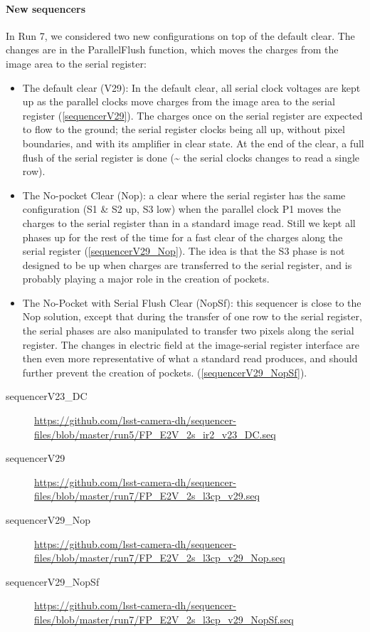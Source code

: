 \paragraph{New sequencers}\label{new-sequencers}
In Run 7, we considered two new configurations on top of the default clear. The changes are in the ParallelFlush function, which
moves the charges from the image area to the serial register:

\begin{itemize}
\tightlist
\item
  The default clear (V29): In the default clear, all serial clock voltages are
  kept up as the parallel clocks move charges from the image area to the
  serial register (\hyperref[sequencerV29]{{[}sequencerV29{]}}). The
  charges once on the serial register are expected to flow to the ground;
  the serial register clocks being all up, without pixel boundaries, and
  with its amplifier in clear state. At the end of the clear, a full
  flush of the serial register is done (\textasciitilde{} the serial
  clocks changes to read a single row).
\item
  The No-pocket Clear (Nop): a clear where the serial register has the
  same configuration (S1 \& S2 up, S3 low) when the parallel clock P1
  moves the charges to the serial register than in a standard image read. Still we kept all phases up for the rest of the time for a fast clear
  of the charges along the serial register
  (\hyperref[sequencerV29_Nop]{{[}sequencerV29\_Nop{]}}). The idea is
  that the S3 phase is not designed to be up when charges are transferred
  to the serial register, and is probably playing a major role in the creation of pockets.
\item
  The No-Pocket with Serial Flush Clear (NopSf): this sequencer is close
  to the Nop solution, except that during the transfer of one row to
  the serial register, the serial phases are also manipulated to transfer two
  pixels along the serial register. The changes in electric field at the
  image-serial register interface are then even more representative of
  what a standard read produces, and should further prevent the
  creation of pockets.
  (\hyperref[sequencerV29_NopSf]{{[}sequencerV29\_NopSf{]}}).
\end{itemize}
\begin{description}
\item[\label{sequencerV23_DC}{sequencerV23\_DC}]
\url{https://github.com/lsst-camera-dh/sequencer-files/blob/master/run5/FP_E2V_2s_ir2_v23_DC.seq}
\item[\label{sequencerV29}{sequencerV29}]
\url{https://github.com/lsst-camera-dh/sequencer-files/blob/master/run7/FP_E2V_2s_l3cp_v29.seq}
\item[\label{sequencerV29_Nop}{sequencerV29\_Nop}]
\url{https://github.com/lsst-camera-dh/sequencer-files/blob/master/run7/FP_E2V_2s_l3cp_v29_Nop.seq}
\item[\label{sequencerV29_NopSf}{sequencerV29\_NopSf}]
\url{https://github.com/lsst-camera-dh/sequencer-files/blob/master/run7/FP_E2V_2s_l3cp_v29_NopSf.seq}
\end{description}

